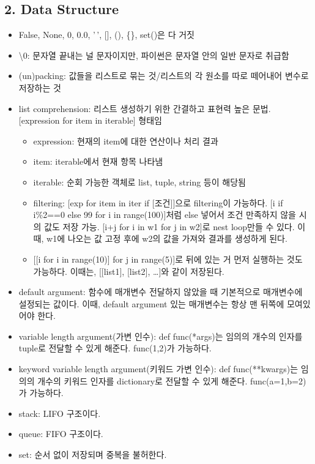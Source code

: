 \hypertarget{data-structure}{%
\subsection{2. Data Structure}\label{data-structure}}

\begin{itemize}
\tightlist
\item
  False, None, 0, 0.0, '\,', {[}{]}, (), \{\}, set()은 다 거짓
\item
  \textbackslash0: 문자열 끝내는 널 문자이지만, 파이썬은 문자열 안의
  일반 문자로 취급함
\item
  (un)packing: 값들을 리스트로 묶는 것/리스트의 각 원소를 따로 떼어내어
  변수로 저장하는 것
\item
  list comprehension: 리스트 생성하기 위한 간결하고 표현력 높은 문법.
  {[}expression for item in iterable{]} 형태임

  \begin{itemize}
  \tightlist
  \item
    expression: 현재의 item에 대한 연산이나 처리 결과
  \item
    item: iterable에서 현재 항목 나타냄
  \item
    iterable: 순회 가능한 객체로 list, tuple, string 등이 해당됨
  \item
    filtering: {[}exp for item in iter if {[}조건{]}{]}으로 filtering이
    가능하다. {[}i if i\%2==0 else 99 for i in range(100){]}처럼 else
    넣어서 조건 만족하지 않을 시의 값도 저장 가능. {[}i+j for i in w1
    for j in w2{]}로 nest loop만들 수 있다. 이때, w1에 나오는 값 고정
    후에 w2의 값을 가져와 결과를 생성하게 된다.
  \item
    {[}{[}i for i in range(10){]} for j in range(5){]}로 뒤에 있는 거
    먼저 실행하는 것도 가능하다. 이때는, {[}{[}list1{]}, {[}list2{]},
    \ldots{]}와 같이 저장된다.
  \end{itemize}
\item
  default argument: 함수에 매개변수 전달하지 않았을 때 기본적으로
  매개변수에 설정되는 값이다. 이때, default argument 있는 매개변수는
  항상 맨 뒤쪽에 모여있어야 한다.
\item
  variable length argument(가변 인수): def func(*args)는 임의의 개수의
  인자를 tuple로 전달할 수 있게 해준다. func(1,2)가 가능하다.
\item
  keyword variable length argument(키워드 가변 인수): def
  func(**kwargs)는 임의의 개수의 키워드 인자를 dictionary로 전달할 수
  있게 해준다. func(a=1,b=2)가 가능하다.
\item
  stack: LIFO 구조이다.
\item
  queue: FIFO 구조이다.
\item
  set: 순서 없이 저장되며 중복을 불허한다.


\end{itemize}
